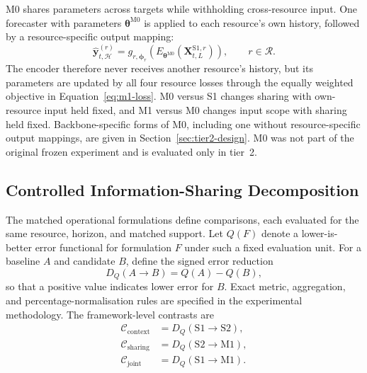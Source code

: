\documentclass[a4paper,fleqn]{cas-dc}
\begin{document}
M0 shares parameters across targets while withholding cross-resource input.
One forecaster with parameters $\boldsymbol{\theta}^{\mathrm{M0}}$ is applied
to each resource's own history, followed by a resource-specific output
mapping:
\begin{equation}
  \widehat{\mathbf{y}}_{t,\mathcal{H}}^{(r)}
  = g_{r,\boldsymbol{\phi}_r}\!\left(
      E_{\boldsymbol{\theta}^{\mathrm{M0}}}
      (\mathbf{X}_{t,L}^{\mathrm{S1},r})\right),
  \qquad r\in\mathcal{R}.
  \label{eq:m0-forecast}
\end{equation}
The encoder therefore never receives another resource's history, but its
parameters are updated by all four resource losses through the equally
weighted objective in Equation~\ref{eq:m1-loss}. M0 versus S1 changes sharing
with own-resource input held fixed, and M1 versus M0 changes input scope with
sharing held fixed. Backbone-specific forms of M0, including one without
resource-specific output mappings, are given in
Section~\ref{sec:tier2-design}. M0 was not part of the original frozen
experiment and is evaluated only in tier~2.

\subsection{Controlled Information-Sharing Decomposition}
\label{sec:decomposition}

The matched operational formulations define comparisons, each evaluated for the same
resource, horizon, and matched support. Let $Q(F)$ denote a lower-is-better
error functional for formulation $F$ under such a fixed evaluation unit. For
a baseline $A$ and candidate $B$, define the signed error reduction
\begin{equation}
  D_Q(A\rightarrow B)=Q(A)-Q(B),
  \label{eq:controlled-reduction}
\end{equation}
so that a positive value indicates lower error for $B$. Exact metric,
aggregation, and percentage-normalisation rules are specified in the
experimental methodology. The framework-level contrasts are
\begin{equation}
  \begin{aligned}
    \mathcal{C}_{\mathrm{context}}
      &= D_Q(\mathrm{S1}\rightarrow\mathrm{S2}), \\
    \mathcal{C}_{\mathrm{sharing}}
      &= D_Q(\mathrm{S2}\rightarrow\mathrm{M1}), \\
    \mathcal{C}_{\mathrm{joint}}
      &= D_Q(\mathrm{S1}\rightarrow\mathrm{M1}).
  \end{aligned}
  \label{eq:controlled-contrasts}
\end{equation}
\end{document}
